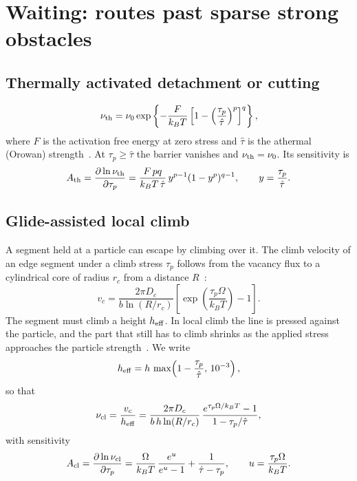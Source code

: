 \documentclass[11pt]{article}
\newcommand{\kT}{k_BT}
\numberwithin{equation}{section}
\begin{document}
\section{Waiting: routes past sparse strong obstacles}
\label{sec:routes}
\subsection{Thermally activated detachment or cutting}
\begin{equation}
\nu_{\rm th}=\nu_0\exp\left\{-\frac{F}{\kT}\left[1-\left(\frac{\tau_p}{\hat\tau}\right)^p\right]^q\right\},
\label{eq:nuth}
\end{equation}
where $F$ is the activation free energy at zero stress and $\hat\tau$ is the athermal (Orowan) strength~\cite{KocksArgonAshby,RoslerArzt}. At $\tau_p\ge\hat\tau$ the barrier vanishes and $\nu_{\rm th}=\nu_0$. Its sensitivity is
\begin{equation}
A_{\rm th}=\frac{\partial\ln\nu_{\rm th}}{\partial\tau_p}=\frac{F\,pq}{\kT\,\hat\tau}\,y^{p-1}(1-y^p)^{q-1},\qquad y=\frac{\tau_p}{\hat\tau}.
\end{equation}

\subsection{Glide-assisted local climb}
A segment held at a particle can escape by climbing over it. The climb velocity of an edge segment under a climb stress $\tau_p$ follows from the vacancy flux to a cylindrical core of radius $r_c$ from a distance $R$~\cite{HirthLothe}:
\begin{equation}
v_c=\frac{2\pi D_c}{b\ln(R/r_c)}\left[\exp\left(\frac{\tau_p\Omega}{\kT}\right)-1\right].
\label{eq:vc}
\end{equation}
The segment must climb a height $h_{\rm eff}$. In local climb the line is pressed against the particle, and the part that still has to climb shrinks as the applied stress approaches the particle strength~\cite{BrownHam,ArztAshby1982}. We write
\begin{equation}
h_{\rm eff}=h\,\max\!\left(1-\frac{\tau_p}{\hat\tau},\,10^{-3}\right),
\end{equation}
so that
\begin{equation}
\nu_{\rm cl}=\frac{v_c}{h_{\rm eff}}=\frac{2\pi D_c}{b\,h\ln(R/r_c)}\,\frac{e^{\tau_p\Omega/\kT}-1}{1-\tau_p/\hat\tau},
\label{eq:nucl}
\end{equation}
with sensitivity
\begin{equation}
A_{\rm cl}=\frac{\partial\ln\nu_{\rm cl}}{\partial\tau_p}=\frac{\Omega}{\kT}\,\frac{e^u}{e^u-1}+\frac{1}{\hat\tau-\tau_p},\qquad u=\frac{\tau_p\Omega}{\kT}.
\end{equation}
\end{document}
